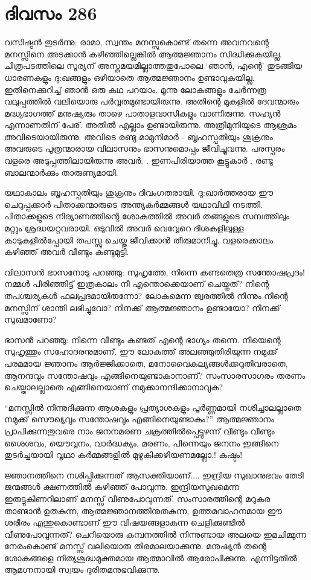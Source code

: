 \section{ദിവസം 286}


വസിഷ്ഠന്‍ തുടര്‍ന്നു: രാമാ, സ്വന്തം മനസ്സുകൊണ്ട് തന്നെ അവനവന്റെ മനസ്സിനെ അടക്കാന്‍ കഴിഞ്ഞില്ലെങ്കില്‍ ആത്മജ്ഞാനം സിദ്ധിക്കുകയില്ല. ചിത്രപടത്തിലെ സൂര്യന് അസ്തമയമില്ലാത്തതുപോലെ ‘ഞാന്‍, എന്റെ’ തുടങ്ങിയ ധാരണകളും ദു:ഖങ്ങളും ഒഴിയാതെ ആത്മജ്ഞാനം ഉണ്ടാവുകയില്ല. ഇതിനെക്കുറിച്ച് ഞാന്‍ ഒരു കഥ പറയാം. മൂന്നു ലോകങ്ങളും ചേര്‍ന്നത്ര വലുപ്പത്തില്‍ വലിയൊരു പര്‍വ്വതമുണ്ടായിരുന്നു. അതിന്റെ മുകളില്‍ ദേവന്മാരും മദ്ധ്യഭാഗത്ത് മനുഷ്യരും താഴെ പാതാളവാസികളും വാണിരുന്നു. സഹ്യന്‍ എന്നാണതിന് പേര്. അതില്‍ എല്ലാം ഉണ്ടായിരുന്നു. അത്രിമുനിയുടെ ആശ്രമം അവിടെയായിരുന്നു. അവിടെ രണ്ടു മാമുനിമാര്‍ - ബൃഹസ്പതിയും ശുക്രനും അവരുടെ പുത്രന്മാരായ വിലാസനും ഭാസനുമൊപ്പം ജീവിച്ചുവന്നു.  പരസ്പരം വളരെ അടുപ്പത്തിലായിരുന്നു അവര്‍. . ഇണപിരിയാത്ത കൂട്ടുകാര്‍ .  രണ്ടു ബാലന്മാര്‍ക്കും താരുണ്യമായി. 

യഥാകാലം  ബൃഹസ്പതിയും ശുക്രനും ദിവംഗതരായി. ദു:ഖാര്‍ത്തരായ ഈ ചെറുപ്പക്കാര്‍ പിതാക്കന്മാരുടെ അന്ത്യകര്‍മ്മങ്ങള്‍ യഥാവിഥി നടത്തി. പിതാക്കളുടെ നിര്യാണത്തിന്റെ ശോകത്തില്‍ അവര്‍ തങ്ങളുടെ സമ്പത്തിലും മറ്റും ശ്രദ്ധയറ്റവരായി. ഒടുവില്‍ അവര്‍ വെവ്വേറെ ദിശകളിലുള്ള കാടുകളില്‍പ്പോയി തപസ്സു ചെയ്തു ജീവിക്കാന്‍ തീരുമാനിച്ചു. വളരെക്കാലം കഴിഞ്ഞ് അവര്‍ വീണ്ടും കണ്ടുമുട്ടി.
 
വിലാസന്‍ ഭാസനോടു പറഞ്ഞു: സുഹൃത്തേ, നിന്നെ കണ്ടതെത്ര സന്തോഷപ്രദം! നമ്മള്‍ പിരിഞ്ഞിട്ട് ഇത്രകാലം നീ എന്തൊക്കെയാണ് ചെയ്തത്? നിന്റെ തപശ്ചര്യകള്‍ ഫലപ്രദമായിരുന്നോ? ലോകമെന്ന ജ്വരത്തില്‍ നിന്നും നിന്റെ മനസ്സിന് ശാന്തി ലഭിച്ചുവോ? നിനക്ക് ആത്മജ്ഞാനം ഉണ്ടായോ? നിനക്ക് സുഖമാണോ?

ഭാസന്‍ പറഞ്ഞു: നിന്നെ വീണ്ടും കണ്ടത് എന്റെ ഭാഗ്യം തന്നെ. നീയെന്റെ സുഹൃത്തും സഹോദരനുമാണ്. ഈ ലോകത്ത് അലഞ്ഞുതിരിയുന്ന നമുക്ക് പരമമായ ജ്ഞാനം ആര്‍ജ്ജിക്കാതെ, മനോവൈകല്യങ്ങള്‍ക്കറുതിവരാതെ,   ആനന്ദവും സന്തോഷവും എങ്ങിനെയുണ്ടാകാനാണ്? സംസാരസാഗരം തരണം ചെയ്താലല്ലാതെ എങ്ങിനെയാണ് നമുക്കാനന്ദിക്കാനാവുക?

“മനസ്സില്‍ നിന്നുദിക്കുന്ന ആശകളും പ്രത്യാശകളും പൂര്‍ണ്ണമായി നശിച്ചാലല്ലാതെ നമുക്ക് സൌഖ്യവും സന്തോഷവും എങ്ങിനെയുണ്ടാകും?” ആത്മജ്ഞാനം പ്രാപിക്കുന്നതുവരെ നാം ജനനമരണ ചക്രത്തില്‍പ്പെട്ടുഴന്ന് വീണ്ടും വീണ്ടും ശൈശവം, യൌവ്വനം, വാര്‍ദ്ധക്യം, മരണം, പിന്നെയും ജനനം ഇങ്ങിനെ തുടര്‍ച്ചയായി വൃഥാ കര്‍മ്മങ്ങളില്‍ മുഴുകിക്കഴിയണമല്ലോ.! കഷ്ടം!

ജ്ഞാനത്തിനെ നശിപ്പിക്കുന്നത് ആസക്തിയാണ്‌....   ഇന്ദ്രിയ സുഖാനുഭവം തേടി ജന്മങ്ങള്‍  ക്ഷണത്തില്‍ കഴിഞ്ഞ് പോവുന്നു. ഇന്ദ്രിയസുഖമെന്ന ഇരുട്ടുകിണറിലാണ് മനസ്സ് വീണുപോവുന്നത്. സംസാരത്തിന്റെ മറുകര താണ്ടാന്‍ ഉതകുന്ന, ആത്മജ്ഞാനത്തിനുതകുന്ന, ഉത്തമവാഹനമായ ഈ ശരീരം എന്തുകൊണ്ടാണ് ഈ വിഷയങ്ങളാകുന്ന ചെളിക്കുണ്ടില്‍ വീണുപോവുന്നത്? ചെറിയൊരു കമ്പനത്തില്‍ നിന്നുണ്ടായ അലയെ ഇമചിമ്മുന്ന നേരംകൊണ്ട് മനസ്സ്  വലിയൊരു തിരമാലയാക്കുന്നു. മനുഷ്യന്‍ തന്റെ ശോകങ്ങളെ നിത്യശുദ്ധമുക്തമായ ആത്മാവില്‍ ആരോപിക്കുന്നു. എന്നിട്ടതില്‍ ആമഗ്നനായി സ്വയം ദുരിതമനുഭവിക്കുന്നു.

